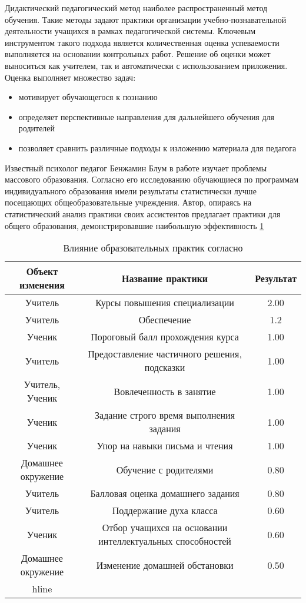 Дидактический педагогический метод наиболее распространенный метод обучения.
Такие методы задают практики организации учебно-познавательной деятельности 
учащихся в рамках педагогической системы. Ключевым инструментом такого подхода является 
количественная оценка успеваемости выполняется на основании контрольных работ. Решение об оценки может выноситься как учителем,
 так и автоматически с использованием приложения. Оценка выполняет множество задач: \begin{itemize}
    \item мотивирует обучающегося к познанию
    \item определяет перспективные направления для дальнейшего обучения для родителей
    \item позволяет сравнить различные подходы к изложению материала для педагога 
\end{itemize}

Известный психолог педагог Бенжамин Блум в работе \cite{bloom1984} изучает проблемы массового образования.
Согласно его исследованию обучающиеся по программам индивидуального образования имели результаты статистически лучше
посещающих общеобразовательные учреждения. Автор, опираясь на статистический анализ практики
своих ассистентов предлагает практики для общего образования, демонстрировавшие наибольшую эффективность \ref{bloom_table}

\begin{table}
    \centering
    \begin{tabular}{|c |c| c |}
        Объект изменения &	Название практики &  Результат\\
        \hline
        Учитель & Курсы повышения специализации &	2.00 \\	
        Учитель	& Обеспечение	& 1.2	\\	 
        Ученик	& Пороговый балл прохождения курса & 1.00	\\	
        Учитель	& Предоставление частичного решения, подсказки	& 1.00	\\	
        Учитель, Ученик	& Вовлеченность в занятие & 1.00	\\	
        Ученик	& Задание строго время выполнения задания &	1.00	\\
        Ученик & Упор на навыки письма и чтения & 	1.00	\\
        Домашнее окружение & Обучение с родителями &	0.80 \\	
        Учитель	& Балловая оценка домашнего задания	&0.80	\\
        Учитель	& Поддержание духа класса &	0.60	\\
        Ученик	& Отбор учащихся на основании интеллектуальных способностей	 &0.60	\\
        Домашнее окружение & Изменение домашней обстановки & 0.50 \\
        hline	
    \end{tabular}
    \caption{Влияние образовательных практик согласно \cite{bloom1984}}
    \label{bloom_table}
\end{table}

